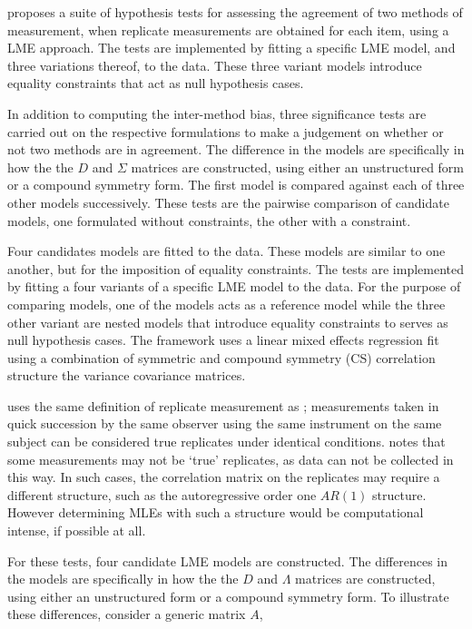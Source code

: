 \documentclass[12pt, a4paper]{report}
\theoremstyle{plain}
\theoremstyle{definition}
\theoremstyle{remark}
\begin{document}
\citet{ARoy2009} proposes a suite of hypothesis tests for assessing the agreement of two methods of measurement, when replicate measurements are obtained for each item, using a LME approach. The tests are implemented by fitting a specific LME model, and three variations thereof, to the data. These three variant models introduce equality constraints that act as null hypothesis cases.
	
In addition to computing the inter-method bias, three significance tests are carried out on the respective formulations to make a judgement on whether or not two methods are in agreement. The difference in the models are specifically in how the the $D$ and $\Sigma$ matrices are constructed, using either an unstructured form or a compound symmetry form. The first model is compared against each of three other models successively. These tests are the pairwise comparison of candidate models, one formulated without constraints, the other with a constraint.


	
Four candidates models are fitted to the data. These models are similar to one another, but for the imposition of equality constraints. The tests are implemented by fitting a four variants of a specific LME model to the data. For the purpose of comparing models, one of the models acts as a reference model while the three other variant are nested models that introduce equality constraints to serves as null hypothesis cases. The framework uses a linear mixed effects regression fit using a combination of symmetric and compound symmetry (CS) correlation structure the variance covariance matrices.	

\citet{ARoy2009} uses the same definition of replicate measurement as \citet{BA99}; measurements taken in quick succession by the same observer using the same instrument on the same subject can be considered true replicates under identical conditions. \citet{ARoy2009} notes that some measurements may not be `true' replicates, as data can not be collected in this way. In such cases, the correlation matrix on the replicates may require a different structure, such as the autoregressive order one $AR(1)$ structure. However determining MLEs with such a structure would be computational intense, if possible at all.
	
 For these tests, four candidate LME models are constructed. The differences in the models are specifically in how the the $D$ and $\Lambda$ matrices are constructed, using either an unstructured form or a compound symmetry form. To illustrate these differences, consider a generic matrix $A$,
	
\end{document}
